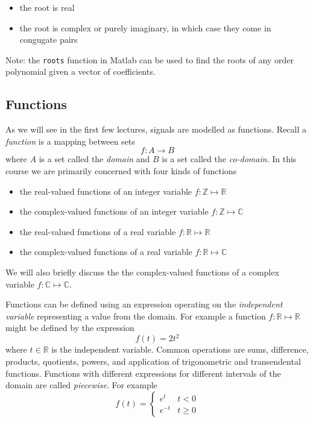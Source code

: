 \begin{itemize}
\item the root is real
\item the root is complex or purely imaginary, in which case they come in congugate pairs 
\end{itemize}

Note: the \texttt{roots} function in Matlab can be used to find the roots of any order polynomial given a vector of coefficients.

\subsection{Functions}

As we will see in the first few lectures, signals are modelled as functions. Recall a \textit{function} is a mapping between sets
\[
f: A \rightarrow B
\]
where $A$ is a set called the {\it domain} and $B$ is a set called the {\it co-domain}. In this course we are primarily concerned with four kinds of functions

\begin{itemize}
\item the real-valued functions of an integer variable $f:\mathbb{Z}\mapsto\mathbb{R}$
\item the complex-valued functions of an integer variable $f:\mathbb{Z}\mapsto\mathbb{C}$
\item the real-valued functions of a real variable $f:\mathbb{R}\mapsto\mathbb{R}$
\item the complex-valued functions of a real variable $f:\mathbb{R}\mapsto\mathbb{C}$
\end{itemize}
We will also briefly discuss the the complex-valued functions of a complex variable $f:\mathbb{C}\mapsto\mathbb{C}$.

Functions can be defined using an expression operating on the \textit{independent variable} representing a value from the domain. For example a function $f:\mathbb{R}\mapsto\mathbb{R}$ might be defined by the expression
\[
f(t) = 2t^2
\]
where $t\in\mathbb{R}$ is the independent variable. Common operations are sums, difference, products, quotients, powers, and application of trigonometric and transendental functions. Functions with different expressions for different intervals of the domain are called \textit{piecewise}. For example
\[
f(t) = \left\{ \begin{array}{cc}
   e^{t} & t < 0\\
   e^{-t} & t \geq 0
\end{array}
\right.
\]

